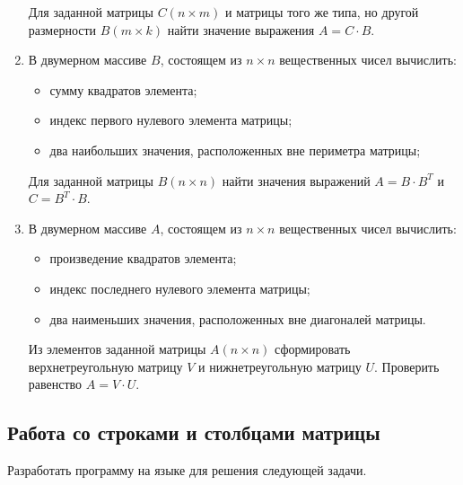\begin{enumerate}
Для заданной матрицы $C(n\times m)$ и матрицы того же типа, но другой размерности
$B(m\times k)$ найти значение выражения  $A=C\cdot B$.

\item В двумерном массиве $B$, состоящем из $n\times n$ вещественных чисел вычислить:

\begin{itemize}
\item сумму квадратов элемента;
\item индекс первого нулевого элемента матрицы;
\item два наибольших значения, расположенных вне периметра матрицы;
\end{itemize}

Для заданной матрицы $B(n\times n)$ найти значения выражений  $A=B\cdot B^T$ и 
$C=B^T\cdot B$.
\item В двумерном массиве $A$, состоящем из $n\times n$ вещественных чисел
вычислить:

\begin{itemize}
\item произведение квадратов элемента;
\item индекс последнего нулевого элемента матрицы;
\item два наименьших значения, расположенных вне диагоналей матрицы.
\end{itemize}

Из элементов заданной матрицы $A(n\times n)$ сформировать верхнетреугольную матрицу
$V$ и нижнетреугольную матрицу $U$. Проверить равенство  $A=V\cdot U$.
\end{enumerate}

\subsection[Работа со строками и столбцами матрицы]{Работа со строками и столбцами матрицы}
Разработать программу на языке  для решения следующей задачи.

